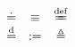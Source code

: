 \[
\begin{array}{ccc}
	\doteq & \equiv & \overset{\mathrm{def}}{=\hspace{-1em}=} \\
	\overset{\mathrm{d}}{=} & := & \triangleq
\end{array}
\]